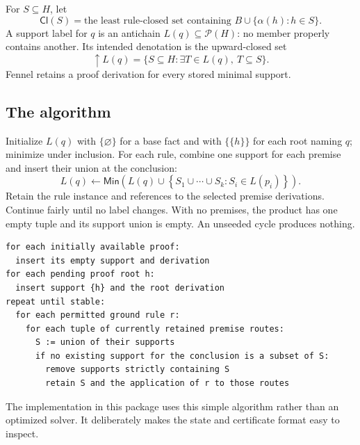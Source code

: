 \documentclass[11pt,a4paper]{article}
\theoremstyle{definition}
\theoremstyle{remark}
\newcommand{\Cl}{\mathsf{Cl}}
\newcommand{\Min}{\mathsf{Min}}
\begin{document}
For $S\subseteq H$, let
\[
 \Cl(S)=\text{the least rule-closed set containing }
 B\cup\{\alpha(h):h\in S\}.
\]
A support label for $q$ is an antichain $L(q)\subseteq\mathcal P(H)$: no member
properly contains another. Its intended denotation is the upward-closed set
\[
 \uparrow L(q)=\{S\subseteq H:\exists T\in L(q),\ T\subseteq S\}.
\]
Fennel retains a proof derivation for every stored minimal support.

\subsection{The algorithm}
Initialize $L(q)$ with $\{\varnothing\}$ for a base fact and with $\{\{h\}\}$
for each root naming $q$; minimize under inclusion. For each rule, combine one
support for each premise and insert their union at the conclusion:
\begin{equation}\label{eq:frontier-update}
 L(q)\gets\Min\left(L(q)\cup
 \left\{S_1\cup\cdots\cup S_k:S_i\in L(p_i)\right\}\right).
\end{equation}
Retain the rule instance and references to the selected premise derivations.
Continue fairly until no label changes. With no premises, the product has one
empty tuple and its support union is empty. An unseeded cycle produces nothing.

\begin{lstlisting}
for each initially available proof:
  insert its empty support and derivation
for each pending proof root h:
  insert support {h} and the root derivation
repeat until stable:
  for each permitted ground rule r:
    for each tuple of currently retained premise routes:
      S := union of their supports
      if no existing support for the conclusion is a subset of S:
        remove supports strictly containing S
        retain S and the application of r to those routes
\end{lstlisting}

The implementation in this package uses this simple algorithm rather than an
optimized solver. It deliberately makes the state and certificate format easy
to inspect.
\end{document}
